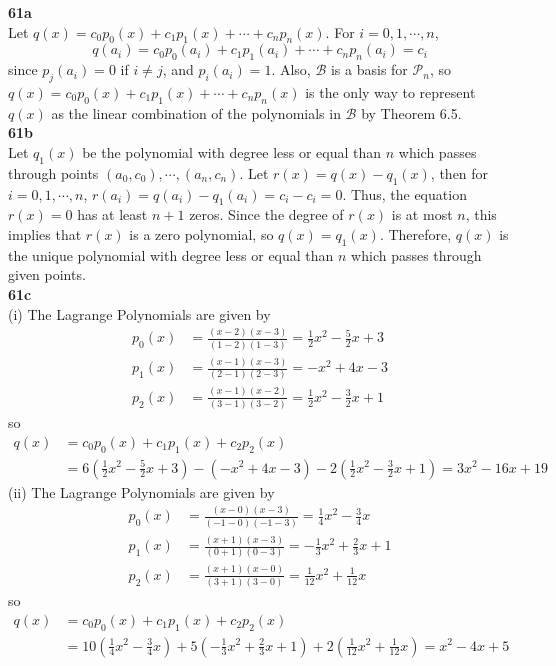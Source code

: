 \textbf{61a} \\
Let $q(x) = c_0p_0(x) + c_1p_1(x) + \cdots + c_np_n(x)$. For $i = 0, 1, \cdots, n$, \begin{equation*}
	q(a_i) = c_0p_0(a_i) + c_1p_1(a_i) + \cdots + c_np_n(a_i) = c_i
\end{equation*} since $p_j(a_i) = 0$ if $i \neq j$, and $p_i(a_i) = 1$. Also, $\mathcal{B}$ is a basis for $\mathscr{P}_n$, so $q(x) = c_0p_0(x) + c_1p_1(x) + \cdots + c_np_n(x)$ is the only way to represent $q(x)$ as the linear combination of the polynomials in $\mathcal{B}$ by Theorem 6.5. \\

\textbf{61b} \\
Let $q_1(x)$ be the polynomial with degree less or equal than $n$ which passes through points $(a_0, c_0), \cdots, (a_n, c_n)$. Let $r(x) = q(x) - q_1(x)$, then for $i = 0, 1, \cdots, n$, $r(a_i) = q(a_i) - q_1(a_i) = c_i - c_i = 0$. Thus, the equation $r(x) = 0$ has at least $n + 1$ zeros. Since the degree of $r(x)$ is at most $n$, this implies that $r(x)$ is a zero polynomial, so $q(x) = q_1(x)$. Therefore, $q(x)$ is the unique polynomial with degree less or equal than $n$ which passes through given points. \\

\textbf{61c} \\
(i) The Lagrange Polynomials are given by \begin{align*}
	p_0(x) &= \frac{(x - 2)(x - 3)}{(1 - 2)(1 - 3)} = \frac{1}{2}x^2 - \frac{5}{2}x + 3 \\
	p_1(x) &= \frac{(x - 1)(x - 3)}{(2 - 1)(2 - 3)} = -x^2 + 4x - 3 \\
	p_2(x) &= \frac{(x - 1)(x - 2)}{(3 - 1)(3 - 2)} = \frac{1}{2}x^2 - \frac{3}{2}x + 1
\end{align*} so \begin{align*}
	q(x) &= c_0p_0(x) + c_1p_1(x) + c_2p_2(x) \\
	&= 6(\frac{1}{2}x^2 - \frac{5}{2}x + 3) - (-x^2 + 4x - 3) - 2(\frac{1}{2}x^2 - \frac{3}{2}x + 1) = 3x^2 - 16x + 19
\end{align*}
(ii) The Lagrange Polynomials are given by \begin{align*}
p_0(x) &= \frac{(x - 0)(x - 3)}{(-1 - 0)(-1 - 3)} = \frac{1}{4}x^2 - \frac{3}{4}x \\
p_1(x) &= \frac{(x + 1)(x - 3)}{(0 + 1)(0 - 3)} = -\frac{1}{3}x^2 + \frac{2}{3}x + 1 \\
p_2(x) &= \frac{(x + 1)(x - 0)}{(3 + 1)(3 - 0)} = \frac{1}{12}x^2 + \frac{1}{12}x
\end{align*} so \begin{align*}
q(x) &= c_0p_0(x) + c_1p_1(x) + c_2p_2(x) \\
&= 10(\frac{1}{4}x^2 - \frac{3}{4}x) + 5(-\frac{1}{3}x^2 + \frac{2}{3}x + 1) + 2(\frac{1}{12}x^2 + \frac{1}{12}x) = x^2 - 4x + 5
\end{align*}

